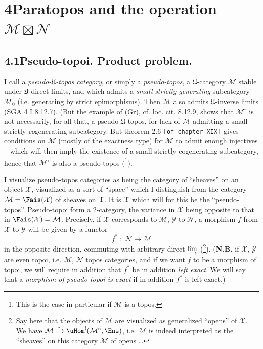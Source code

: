 

\section*{4\quad Paratopos and the operation $\mathcal{M}\boxtimes\mathcal{N}$}

\subsection*{4.1\quad Pseudo-topoi. Product problem.}

I call a \textit{pseudo-$\mathfrak{U}$-topos category}, or simply a \textit{pseudo-topos}, a $\mathfrak{U}$-category $\mathcal{M}$ stable under $\mathfrak{U}$-direct limits, and which admits a \textit{small} \textit{strictly generating} subcategory $\mathcal{M}_0$ (i.e. generating by strict epimorphisms). Then $\mathcal{M}$ also admits $\mathfrak{U}$-inverse limits (SGA 4 I 8.12.7). (But the example of (Gr), cf. loc. cit. 8.12.9, shows that $\mathcal{M}^\circ$ is not necessarily, for all that, a pseudo-$\mathfrak{U}$-topos, for lack of $\mathcal{M}$ admitting a small strictly \textit{co}generating subcategory. But theorem 2.6 \texttt{[of chapter XIX]} gives conditions on $\mathcal{M}$ (mostly of the exactness type) %
for $\mathcal{M}$ to admit enough injectives -- which will then imply the existence of a small strictly cogenerating subcategory, hence that $\mathcal{M}^\circ$ is also a pseudo-topos (\footnote{This is the case in particular if $\mathcal{M}$ is a topos.}).

I visualize pseudo-topos categories as being the category of ``sheaves'' on an object $\mathcal{X}$, visualized as a sort of ``space'' which I distinguish from the category $\mathcal{M}=\Fais(\mathcal{X})$ of sheaves on $\mathcal{X}$. It is $\mathcal{X}$ which will for this be the ``pseudo-topos''. Pseudo-topoi form a 2-category, the variance in $\mathcal{X}$ being opposite to that in $\Fais(\mathcal{X})=\mathcal{M}$. Precisely, if $\mathcal{X}$ corresponds to $\mathcal{M}$, $\mathcal{Y}$ to $\mathcal{N}$, a morphism $f$ from $\mathcal{X}$ to $\mathcal{Y}$ will be given by a functor
\[
f^* \;:\; \mathcal{N} \longrightarrow \mathcal{M}
\tag*{(4.1.1)}
\]
in the opposite direction, commuting with arbitrary direct $\varinjlim$ (\footnote{Say here that the objects of $\mathcal{M}$ are visualized as generalized ``opens'' of $\mathcal{X}$. We have $\mathcal{M}\xrightarrow{\sim}\uHom^!(\mathcal{M}^\circ,\Ens)$, i.e. $\mathcal{M}$ is indeed interpreted as the ``sheaves'' on this category $\mathcal{M}$ of opens \ldots}). (\textbf{N.B.} if $\mathcal{X}$, $\mathcal{Y}$ are even topoi, i.e. $\mathcal{M}$, $\mathcal{N}$ topos categories, and if we want $f$ to be a morphism of topoi, we will require in addition that $f^*$ be in addition \textit{left exact}. We will say that a \textit{morphism of pseudo-topoi is exact} if in addition $f^*$ is left exact.)

